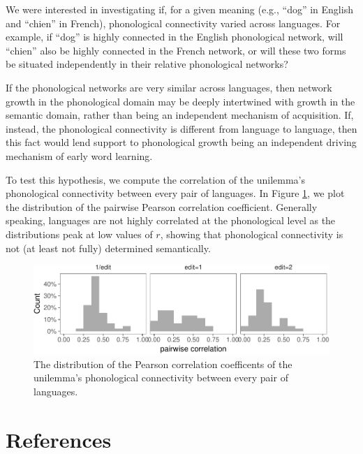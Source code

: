 \documentclass[english,floatsintext,man]{apa6}
\theoremstyle{definition}
\theoremstyle{definition}
\theoremstyle{definition}
\theoremstyle{remark}
\begin{document}
We were interested in investigating if, for a given meaning (e.g.,
\enquote{dog} in English and \enquote{chien} in French), phonological
connectivity varied across languages. For example, if \enquote{dog} is
highly connected in the English phonological network, will
\enquote{chien} also be highly connected in the French network, or will
these two forms be situated independently in their relative phonological
networks?

If the phonological networks are very similar across languages, then
network growth in the phonological domain may be deeply intertwined with
growth in the semantic domain, rather than being an independent
mechanism of acquisition. If, instead, the phonological connectivity is
different from language to language, then this fact would lend support
to phonological growth being an independent driving mechanism of early
word learning.

To test this hypothesis, we compute the correlation of the unilemma's
phonological connectivity between every pair of languages. In Figure
\ref{fig:corrPair}, we plot the distribution of the pairwise Pearson
correlation coefficient. Generally speaking, languages are not highly
correlated at the phonological level as the distributions peak at low
values of \(r\), showing that phonological connectivity is not (at least
not fully) determined semantically.

\begin{figure}[!h]
\includegraphics[width=\textwidth]{ms_files/figure-latex/corrPair-1} \caption{The distribution of the Pearson correlation coefficents of the unilemma's phonological connectivity between every pair of languages.}\label{fig:corrPair}
\end{figure}

\newpage 

\section{References}\label{references}

\setlength{\parindent}{-0.5in} \setlength{\leftskip}{0.5in}
\end{document}
